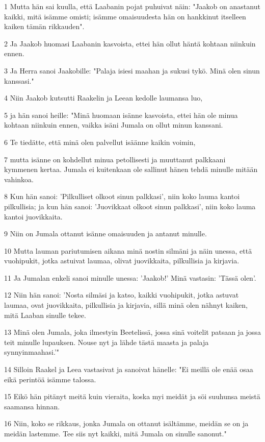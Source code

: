 \par 1 Mutta hän sai kuulla, että Laabanin pojat puhuivat näin: "Jaakob on anastanut kaikki, mitä isämme omisti; isämme omaisuudesta hän on hankkinut itselleen kaiken tämän rikkauden".
\par 2 Ja Jaakob huomasi Laabanin kasvoista, ettei hän ollut häntä kohtaan niinkuin ennen.
\par 3 Ja Herra sanoi Jaakobille: "Palaja isiesi maahan ja sukusi tykö. Minä olen sinun kanssasi."
\par 4 Niin Jaakob kutsutti Raakelin ja Leean kedolle laumansa luo,
\par 5 ja hän sanoi heille: "Minä huomaan isänne kasvoista, ettei hän ole minua kohtaan niinkuin ennen, vaikka isäni Jumala on ollut minun kanssani.
\par 6 Te tiedätte, että minä olen palvellut isäänne kaikin voimin,
\par 7 mutta isänne on kohdellut minua petollisesti ja muuttanut palkkaani kymmenen kertaa. Jumala ei kuitenkaan ole sallinut hänen tehdä minulle mitään vahinkoa.
\par 8 Kun hän sanoi: 'Pilkulliset olkoot sinun palkkasi', niin koko lauma kantoi pilkullisia; ja kun hän sanoi: 'Juovikkaat olkoot sinun palkkasi', niin koko lauma kantoi juovikkaita.
\par 9 Niin on Jumala ottanut isänne omaisuuden ja antanut minulle.
\par 10 Mutta lauman pariutumisen aikana minä nostin silmäni ja näin unessa, että vuohipukit, jotka astuivat laumaa, olivat juovikkaita, pilkullisia ja kirjavia.
\par 11 Ja Jumalan enkeli sanoi minulle unessa: 'Jaakob!' Minä vastasin: 'Tässä olen'.
\par 12 Niin hän sanoi: 'Nosta silmäsi ja katso, kaikki vuohipukit, jotka astuvat laumaa, ovat juovikkaita, pilkullisia ja kirjavia, sillä minä olen nähnyt kaiken, mitä Laaban sinulle tekee.
\par 13 Minä olen Jumala, joka ilmestyin Beetelissä, jossa sinä voitelit patsaan ja jossa teit minulle lupauksen. Nouse nyt ja lähde tästä maasta ja palaja synnyinmaahasi.'"
\par 14 Silloin Raakel ja Leea vastasivat ja sanoivat hänelle: "Ei meillä ole enää osaa eikä perintöä isämme talossa.
\par 15 Eikö hän pitänyt meitä kuin vieraita, koska myi meidät ja söi suuhunsa meistä saamansa hinnan.
\par 16 Niin, koko se rikkaus, jonka Jumala on ottanut isältämme, meidän se on ja meidän lastemme. Tee siis nyt kaikki, mitä Jumala on sinulle sanonut."
